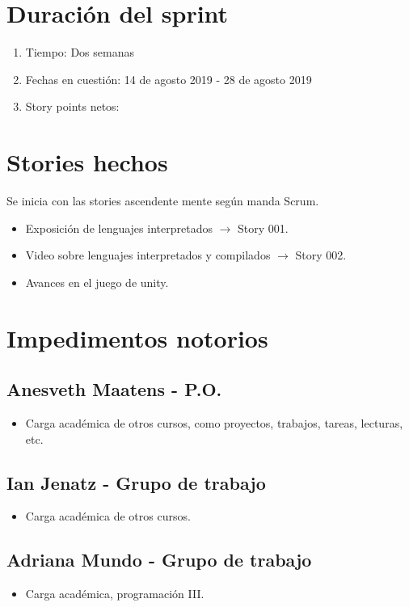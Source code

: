 \section{Duración del sprint}
\begin{enumerate}
    \item Tiempo: Dos semanas
    \item Fechas en cuestión: 14 de agosto 2019 - 28 de agosto 2019
    \item Story points netos: 
\end{enumerate}
\section{Stories hechos}
Se inicia con las stories ascendente mente según manda Scrum.
\begin{itemize}
    \item Exposición de lenguajes interpretados $\rightarrow$ Story 001.
    \item Video sobre lenguajes interpretados y compilados $\rightarrow$ Story 002.
    \item Avances en el juego de unity.
\end{itemize}


\section{Impedimentos notorios}

\subsection{Anesveth Maatens - P.O.}
\begin{itemize}
    \item Carga académica de otros cursos, como proyectos, trabajos, tareas, lecturas, etc.
\end{itemize}
\subsection{Ian Jenatz - Grupo de trabajo}
\begin{itemize}
    \item Carga académica de otros cursos.
\end{itemize}
\subsection{Adriana Mundo - Grupo de trabajo}
\begin{itemize}
    \item Carga académica, programación III.
\end{itemize}


